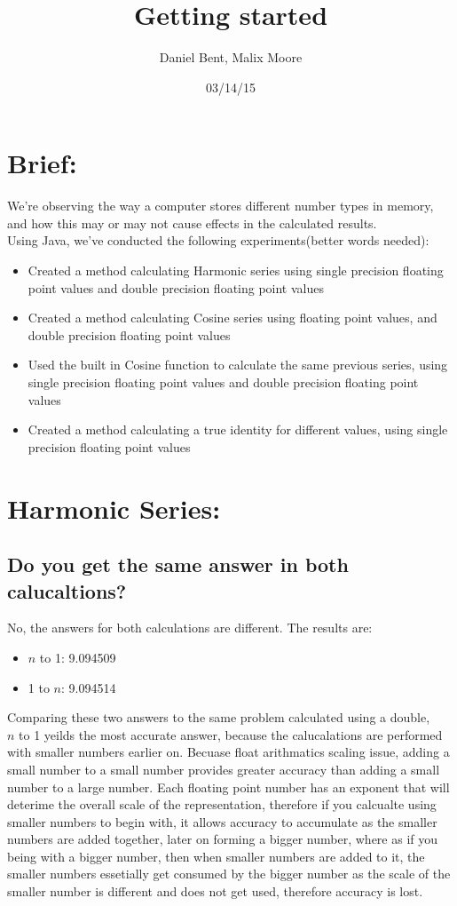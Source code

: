 \documentclass[12pt]{article}
\title{Getting started}
\author{Daniel Bent, Malix Moore}
\date{03/14/15}
\begin{document}
\maketitle

\section*{Brief:}
We’re observing the way a computer stores different number types in memory, and how this may or may not cause effects in the calculated results.\\
Using Java, we’ve conducted the following experiments(better words needed):

\begin{itemize}
  \item Created a method calculating Harmonic series using single precision floating point values and double precision floating point values
  \item Created a method calculating Cosine series using floating point values, and double precision floating point values
  \item Used the built in Cosine function to calculate the same previous series, using single precision floating point values and double precision floating point values
  \item Created a method calculating a true identity for different values, using single precision floating point values
\end{itemize}

\section*{Harmonic Series:}
\begin{itemize}
\subsection*{Do you get the same answer in both calucaltions?}
\end{itemize}
\item No, the answers for both calculations are different. The results are:
\begin{itemize}
\item $n$ to 1: 9.094509
\item 1 to $n$: 9.094514
\end{itemize}
\item Comparing these two answers to the same problem calculated using a double,\\  $n$ to 1 yeilds the most accurate answer, because the calucalations are performed with smaller numbers earlier on. Becuase float arithmatics scaling issue, adding a small number to a small number provides greater accuracy than adding a small number to a large number. Each floating point number has an exponent that will deterime the overall scale of the representation, therefore if you calcualte using smaller numbers to begin with, it allows accuracy to accumulate as the smaller numbers are added together, later on forming a bigger number, where as if you being with a bigger number, then when smaller numbers are added to it, the smaller numbers essetially get consumed by the bigger number as the scale of the smaller number is different and does not get used, therefore accuracy is lost.
\end{document}
